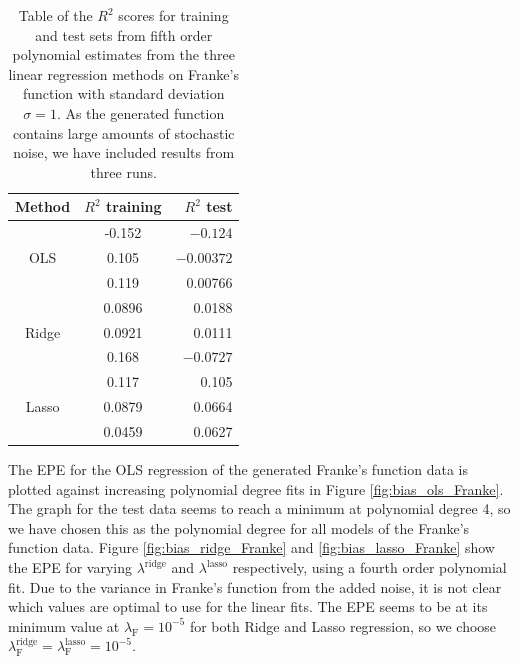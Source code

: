 \documentclass[a4paper, 10pt]{article}
\begin{document}
\begin{multicols}{2}
\begin{table}[H]
\caption{Table of the $R^2$ scores for training and test sets from fifth order polynomial estimates from  the three linear regression methods on Franke's function with standard deviation $\sigma=1$. As the generated function contains large amounts of stochastic noise, we have included results from three runs.\vspace{2pt}}

\label{tab:R2_stddev=1}
\centering
\begin{tabular}{|c|c|r|} \hline 
Method & $R^2$ training & $R^2$ test \\ \hline
\multirow{3}{*}{OLS} & -0.152& $-0.124$\\ 
											& 0.105 & $-0.00372$ \\ 
											& 0.119   & 0.00766\\ \cline{1-3}
\multirow{3}{*}{Ridge} & 0.0896 & 0.0188\\ 
											& 0.0921   & 0.0111 \\ 
											& 0.168      & $-0.0727$\\ \cline{1-3}
\multirow{3}{*}{Lasso} & 0.117& 0.105\\ 
											& 0.0879   & 0.0664 \\ 
											& 0.0459 & 0.0627\\ \cline{1-3}
\end{tabular}
\end{table}

The EPE for the OLS regression of the generated Franke's function data is plotted against increasing polynomial degree fits in Figure \ref{fig:bias_ols_Franke}.  The graph for the test data seems to reach a minimum at polynomial degree 4, so we have chosen this as the polynomial degree for all models of the Franke's function data. Figure \ref{fig:bias_ridge_Franke} and \ref{fig:bias_lasso_Franke} show the EPE for varying $\lambda^\text{ridge}$ and $\lambda^\text{lasso}$ respectively, using a fourth order polynomial fit. Due to the variance in Franke's function from the added  noise, it is not clear which values are optimal to use for the linear fits. The EPE seems to be at its minimum value at $\lambda_\text{F}=10^{-5}$ for both Ridge and Lasso regression, so we choose $\lambda^\text{ridge}_\text{F} = \lambda^\text{lasso}_\text{F}=10^{-5}$.





\end{multicols}
\end{document}
